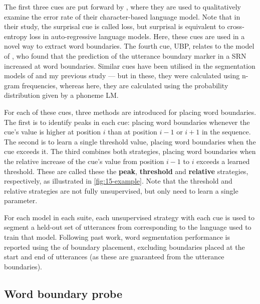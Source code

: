 The first three cues are put forward by \citet{al-rfou_character-level_2019}, where they are used to qualitatively examine the error rate of their character-based language model. Note that in their study, the surprisal cue is called loss, but surprisal is equivalent to cross-entropy loss in auto-regressive language models. Here, these cues are used in a novel way to extract word boundaries. The fourth cue, UBP, relates to the model of \citet{christiansen1998learning}, who found that the prediction of the utterance boundary marker in a SRN increased at word boundaries. Similar cues have been utilised in the segmentation models of \citet{ccoltekin2014explicit} and my previous study \citep{goriely2023word} --- but in these, they were calculated using n-gram frequencies, whereas here, they are calculated using the probability distribution given by a phoneme LM.

For each of these cues, three methods are introduced for placing word boundaries. The first is to identify peaks in each cue: placing word boundaries whenever the cue's value is higher at position $i$ than at position $i-1$ or $i+1$ in the sequence. The second is to learn a single threshold value, placing word boundaries when the cue exceeds it. The third combines both strategies, placing word boundaries when the relative increase of the cue's value from position $i-1$ to $i$ exceeds a learned threshold. These are called these the \textbf{peak}, \textbf{threshold} and \textbf{relative} strategies, respectively, as illustrated in \cref{fig:15-example}. Note that the threshold and relative strategies are not fully unsupervised, but only need to learn a single parameter. %

For each model in each suite, each unsupervised strategy with each cue is used to segment a held-out set of utterances from \ipachildes corresponding to the language used to train that model. Following past work, word segmentation performance is reported using the \fscore of boundary placement, excluding boundaries placed at the start and end of utterances (as these are guaranteed from the utterance boundaries).

\subsection{Word boundary probe}

